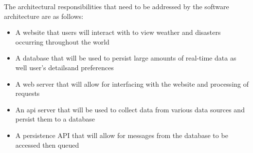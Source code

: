 The architectural responsibilities that need to be addressed by the software architecture are as follows:
\begin{itemize}
	\item A website that users will interact with to view weather and disasters occurring throughout the world
	\item A database that will be used to persist large amounts of real-time data as well user's detailsand preferences
	\item A web server that will allow for interfacing with the website and processing of requests
	\item An api server that will be used to collect data from various data sources and persist them to a database
	\item A persistence API that will allow for messages from the database to be accessed then queued
	
\end{itemize}